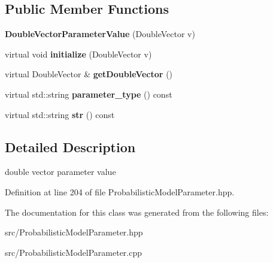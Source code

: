 \subsection*{Public Member Functions}
\begin{DoxyCompactItemize}
\item 
\mbox{\label{classtops_1_1DoubleVectorParameterValue_a2875813c348f24dd33508cf443ad9510}} 
{\bfseries Double\+Vector\+Parameter\+Value} (Double\+Vector v)
\item 
\mbox{\label{classtops_1_1DoubleVectorParameterValue_a9d6c06a590388ab33fbd98c120d0bc8a}} 
virtual void {\bfseries initialize} (Double\+Vector v)
\item 
\mbox{\label{classtops_1_1DoubleVectorParameterValue_a997b2828d36a06aa41be0179a6963436}} 
virtual Double\+Vector \& {\bfseries get\+Double\+Vector} ()
\item 
\mbox{\label{classtops_1_1DoubleVectorParameterValue_a058e87ba54f3c1fe2e41b0273c2df0e1}} 
virtual std\+::string {\bfseries parameter\+\_\+type} () const
\item 
\mbox{\label{classtops_1_1DoubleVectorParameterValue_afba77bcc7858bbc0746179a277d1ac67}} 
virtual std\+::string {\bfseries str} () const
\end{DoxyCompactItemize}


\subsection{Detailed Description}
double vector parameter value 

Definition at line 204 of file Probabilistic\+Model\+Parameter.\+hpp.



The documentation for this class was generated from the following files\+:\begin{DoxyCompactItemize}
\item 
src/Probabilistic\+Model\+Parameter.\+hpp\item 
src/Probabilistic\+Model\+Parameter.\+cpp\end{DoxyCompactItemize}
